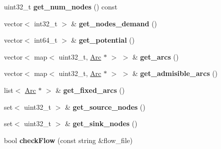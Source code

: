 \begin{DoxyCompactItemize}
\item 
\hypertarget{classflowlessly_1_1Graph_abd66fe2179d2745978276b53dcf8b2fd}{uint32\-\_\-t {\bfseries get\-\_\-num\-\_\-nodes} () const }\label{classflowlessly_1_1Graph_abd66fe2179d2745978276b53dcf8b2fd}

\item 
\hypertarget{classflowlessly_1_1Graph_aa673b4373b56da6e41fbe9b054af2ec5}{vector$<$ int32\-\_\-t $>$ \& {\bfseries get\-\_\-nodes\-\_\-demand} ()}\label{classflowlessly_1_1Graph_aa673b4373b56da6e41fbe9b054af2ec5}

\item 
\hypertarget{classflowlessly_1_1Graph_ab433ff1102bc8c98b7465eb99b3e81f8}{vector$<$ int64\-\_\-t $>$ \& {\bfseries get\-\_\-potential} ()}\label{classflowlessly_1_1Graph_ab433ff1102bc8c98b7465eb99b3e81f8}

\item 
\hypertarget{classflowlessly_1_1Graph_a37fe752749b6a35424e2f2f4fa5857e5}{vector$<$ map$<$ uint32\-\_\-t, \hyperlink{classflowlessly_1_1Arc}{\-Arc} $\ast$ $>$ $>$ \& {\bfseries get\-\_\-arcs} ()}\label{classflowlessly_1_1Graph_a37fe752749b6a35424e2f2f4fa5857e5}

\item 
\hypertarget{classflowlessly_1_1Graph_a85c8535e175ce5a190aa14f6c3b57ecc}{vector$<$ map$<$ uint32\-\_\-t, \hyperlink{classflowlessly_1_1Arc}{\-Arc} $\ast$ $>$ $>$ \& {\bfseries get\-\_\-admisible\-\_\-arcs} ()}\label{classflowlessly_1_1Graph_a85c8535e175ce5a190aa14f6c3b57ecc}

\item 
\hypertarget{classflowlessly_1_1Graph_a8d44f00e2c012a1b95b7a313214dde2c}{list$<$ \hyperlink{classflowlessly_1_1Arc}{\-Arc} $\ast$ $>$ \& {\bfseries get\-\_\-fixed\-\_\-arcs} ()}\label{classflowlessly_1_1Graph_a8d44f00e2c012a1b95b7a313214dde2c}

\item 
\hypertarget{classflowlessly_1_1Graph_aa1cb3aed6dd0113962dad5ae04277f67}{set$<$ uint32\-\_\-t $>$ \& {\bfseries get\-\_\-source\-\_\-nodes} ()}\label{classflowlessly_1_1Graph_aa1cb3aed6dd0113962dad5ae04277f67}

\item 
\hypertarget{classflowlessly_1_1Graph_a3e4fcd56f3de5eee55b957f4cbaf80a7}{set$<$ uint32\-\_\-t $>$ \& {\bfseries get\-\_\-sink\-\_\-nodes} ()}\label{classflowlessly_1_1Graph_a3e4fcd56f3de5eee55b957f4cbaf80a7}

\item 
\hypertarget{classflowlessly_1_1Graph_aa3da1f87177c687ee1465356f187e238}{bool {\bfseries check\-Flow} (const string \&flow\-\_\-file)}\label{classflowlessly_1_1Graph_aa3da1f87177c687ee1465356f187e238}


\end{DoxyCompactItemize}
